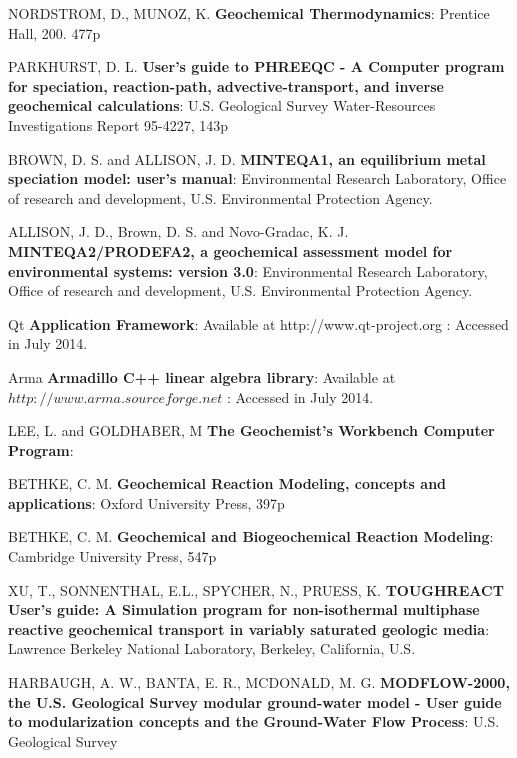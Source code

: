 \documentclass[ppgc,mestrado,english]{iiufrgs}
\begin{document}
\begin{thebibliography}{este-parametro-nao-eh-usado-pelo-estilo-ABNT}
 NORDSTROM, D., MUNOZ, K.
\textbf{Geochemical Thermodynamics}: Prentice Hall, 200. 477p

 PARKHURST, D. L.
\textbf{User's guide to PHREEQC - A Computer program for speciation, reaction-path, advective-transport, and inverse geochemical calculations}: U.S. Geological Survey Water-Resources Investigations Report 95-4227, 143p

 BROWN, D. S. and ALLISON, J. D.
\textbf{MINTEQA1, an equilibrium metal speciation model: user's manual}: Environmental Research Laboratory, Office of research and development, U.S. Environmental Protection Agency.

 ALLISON, J. D., Brown, D. S. and Novo-Gradac, K. J.
\textbf{MINTEQA2/PRODEFA2, a geochemical assessment model for environmental systems: version 3.0}: Environmental Research Laboratory, Office of research and development, U.S. Environmental Protection Agency.

 Qt
\textbf{Application Framework}: Available at http://www.qt-project.org : Accessed in July 2014.

 Arma
\textbf{Armadillo C++ linear algebra library}: Available at $http://www.arma.sourceforge.net$ : Accessed in July 2014.

 LEE, L. and GOLDHABER, M
\textbf{The Geochemist's Workbench Computer Program}: 

 BETHKE, C. M.
\textbf{Geochemical Reaction Modeling, concepts and applications}: Oxford University Press, 397p

 BETHKE, C. M.
\textbf{Geochemical and Biogeochemical Reaction Modeling}: Cambridge University Press, 547p

 XU, T., SONNENTHAL, E.L., SPYCHER, N., PRUESS, K.
\textbf{TOUGHREACT User's guide: A Simulation program for non-isothermal multiphase reactive geochemical transport in variably saturated geologic media}: Lawrence Berkeley National Laboratory, Berkeley, California, U.S.

 HARBAUGH, A. W., BANTA, E. R., MCDONALD, M. G.
\textbf{MODFLOW-2000, the U.S. Geological Survey modular ground-water model - User guide to modularization concepts and the Ground-Water Flow Process}: U.S. Geological Survey


\end{thebibliography}
\end{document}
